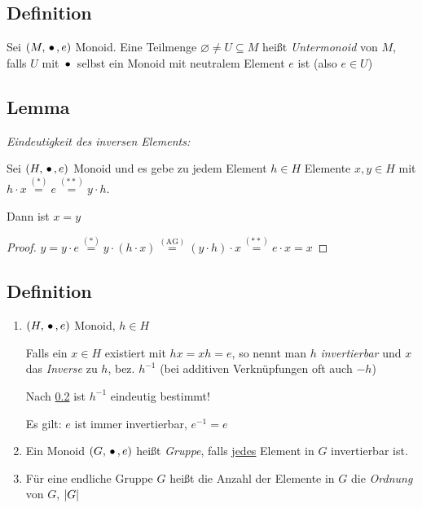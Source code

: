  \subsection[Definition: Untermonoid]{Definition}
 
 Sei $(M, \,{\bullet}\,, e)$ Monoid. Eine Teilmenge $\varnothing \neq U \subseteq M$ heißt \emph{Untermonoid} von $M$, falls $U$ mit $\,{\bullet}\,$ selbst ein Monoid mit neutralem Element $e$ ist (also $e \in U$)

 \subsection[Lemma: Inverses eindeutig]{Lemma} \label{neutElemEindeutig}
 
  \emph{Eindeutigkeit des inversen Elements:}
  
 Sei $(H, \,{\bullet}\,, e)$ Monoid und es gebe zu jedem Element $h \in H$ Elemente $x, y \in H$ mit ${h \cdot x \stackrel{(*)}{=} e \stackrel{(**)}{=} y \cdot h}$.
 
 Dann ist $x = y$
 
 \begin{proof}
 	$y = y \cdot e \stackrel{(*)}{=} y \cdot (h \cdot x) \stackrel{(\text{AG})}{=} (y \cdot h) \cdot x \stackrel{(**)}{=} e \cdot x = x$
 \end{proof}
 
 \subsection[Definition: Gruppe, Inverse, Ordnung]{Definition}
 
 {\renewcommand{\labelenumi}{(\roman{enumi})}
 \begin{enumerate}
 
 	\item
 	$(H, \,{\bullet}\,, e)$ Monoid, $h \in H$
 	
 	Falls ein $x \in H$ existiert mit $hx = xh = e$, so nennt man $h$ \emph{invertierbar} und $x$ das \emph{Inverse} zu $h$, bez. $h^{-1}$
 	(bei additiven Verknüpfungen oft auch $-h$)
 	
 	Nach \ref{neutElemEindeutig} ist $h^{-1}$ eindeutig bestimmt!
 	
 	Es gilt: $e$ ist immer invertierbar, $e^{-1} = e$
 	
 	\item
 	Ein Monoid $(G, \,{\bullet}\,, e)$ heißt \emph{Gruppe}, falls \underline{jedes} Element in $G$ invertierbar ist.
 	
 	\item
 	Für eine endliche Gruppe $G$ heißt die Anzahl der Elemente in $G$ die \emph{Ordnung} von $G$, $\left|G\right|$
 	
 \end{enumerate}
 }
 
